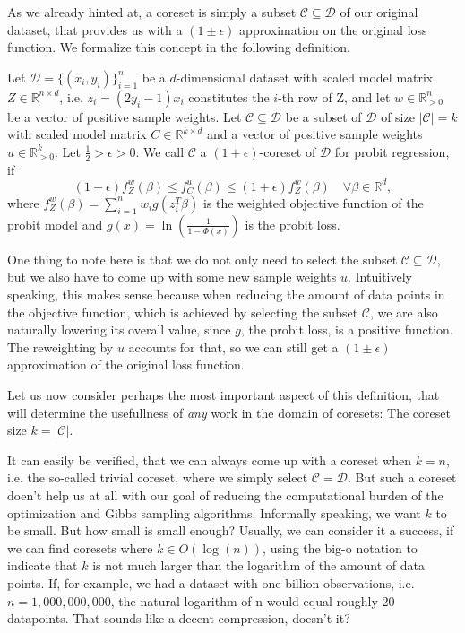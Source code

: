 As we already hinted at, a coreset is simply a subset
$\mathcal{C} \subseteq \mathcal{D}$ of our original dataset,
that provides us with a $(1 \pm \epsilon)$ approximation
on the original loss function.
We formalize this concept in the following definition.

\begin{definition}[Coreset]
    \label{def:coreset}
    Let $\mathcal{D}=\{(x_i, y_i)\}_{i=1}^n$ be a $d$-dimensional dataset
    with scaled model matrix $Z \in \mathbb{R}^{n \times d}$,
    i.e. $z_i = (2y_i - 1)x_i$ constitutes the $i$-th
    row of Z, and let $w \in \mathbb{R}_{>0}^n$ be
    a vector of positive sample weights.
    Let $\mathcal{C} \subseteq \mathcal{D}$ be a subset of $\mathcal{D}$
    of size $|\mathcal{C}| = k$
    with scaled model matrix $C \in \mathbb{R}^{k \times d}$ and
    a vector of positive sample weights $u \in \mathbb{R}_{>0}^k$.
    Let $\frac{1}{2} > \epsilon > 0$.
    We call $\mathcal{C}$ a $(1+\epsilon)$-coreset of $\mathcal{D}$
    for probit regression, if
    \begin{equation*}
        (1-\epsilon)f_Z^w(\beta) \leq f_C^u(\beta) \leq (1+\epsilon)f_Z^w(\beta)
        \quad \forall \beta \in \mathbb{R}^d,
    \end{equation*}
    where $f_Z^w(\beta) = \sum_{i=1}^n w_i g(z_i^T \beta)$ is the
    weighted objective function of the probit model
    and $g(x) = \ln \left( \frac{1}{1 - \Phi(x)} \right)$ is the
    probit loss.
\end{definition}

One thing to note here is that we do not only need to select the
subset $\mathcal{C} \subseteq \mathcal{D}$, but we also have to come
up with some new sample weights $u$.
Intuitively speaking, this makes sense because when reducing the
amount of data points in the objective function, which is
achieved by selecting the subset $\mathcal{C}$, we are
also naturally lowering its overall value, since $g$, the
probit loss, is a positive function. The reweighting
by $u$ accounts for that, so we can still get a $(1 \pm \epsilon)$
approximation of the original loss function.

Let us now consider perhaps the most important aspect of this definition,
that will determine the usefullness of \textit{any} work in the
domain of coresets: The coreset size $k = |\mathcal{C}|$.

It can easily be verified, that we can always come up with a coreset
when $k = n$, i.e. the so-called trivial coreset, where
we simply select $\mathcal{C} = \mathcal{D}$.
But such a coreset doen't help us at all with our goal of reducing the
computational burden of the optimization and Gibbs sampling algorithms.
Informally speaking, we want $k$ to be small. But how small
is small enough? Usually, we can consider it a success, if we
can find coresets where $k \in O(\log(n))$, using the big-o notation
to indicate that $k$ is not much larger than the logarithm
of the amount of data points. If, for example, we had
a dataset with one billion observations, i.e. $n = 1,000,000,000$,
the natural logarithm of n would equal roughly 20 datapoints.
That sounds like a decent compression, doesn't it?

